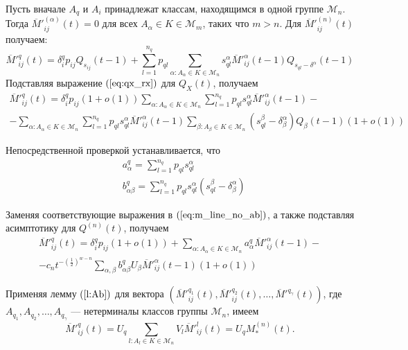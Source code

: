 \documentclass[12pt]{article}
\begin{document}
Пусть вначале $A_q$ и $A_i$ принадлежат классам, находящимся в одной группе $\mathcal{M}_n$. Тогда $\overline{M}'^{(\alpha)}_{ij}(t) = 0$ для всех $A_\alpha \in K \in \mathcal{M}_m$, таких что $m > n$. Для $\overline{M}'^{(n)}_{ij}(t)$ получаем:
\begin{equation*}
	\overline{M}'^q_{ij}(t) = \delta^q_i p_{ij} Q_{s_{ij}}(t - 1) + \sum_{l = 1}^{n_q} p_{ql} \sum_{\alpha : A_\alpha \in K \in \mathcal{M}_n} s_{ql}^\alpha \overline{M}'^\alpha_{ij}(t - 1) Q_{s_{ql} - \delta^\alpha}(t-1)
\end{equation*}
Подставляя выражение $(\ref{eq:qx_rx})$ для $Q_X(t)$, получаем
\begin{multline}
\label{eq:m_line_no_ab}
	\overline{M}'^q_{ij}(t) = \delta^q_i p_{ij} (1 + o(1)) \sum_{\alpha : A_\alpha \in K \in \mathcal{M}_n} \sum_{l = 1}^{n_q} p_{ql} s_{ql}^\alpha \overline{M}'^\alpha_{ij}(t-1) - \\
	- \sum_{\alpha : A_{\alpha} \in K \in \mathcal{M}_n} \sum_{l = 1}^{n_q} p_{ql} s_{ql}^\alpha \overline{M}'^\alpha_{ij}(t-1) \sum_{\beta : A_\beta \in K \in \mathcal{M}_n} (s_{ql}^\beta - \delta^\alpha_\beta) Q_\beta(t-1) (1 + o(1))
\end{multline}

Непосредственной проверкой устанавливается, что
\begin{equation}
\label{eq:ab}
	\begin{split}
		&a^q_\alpha = \sum_{l = 1}^{n_q} p_{ql} s_{ql}^\alpha \\
		&b^q_{\alpha \beta} = \sum_{l = 1}^{n_q} p_{ql} s_{ql}^\alpha (s_{ql}^\beta - \delta^\alpha_\beta)
	\end{split}
\end{equation}

Заменяя соответствующие выражения в $(\ref{eq:m_line_no_ab})$, а также подставляя асимптотику для $Q^{(n)}(t)$, получаем
\begin{multline}
\label{eq:m_line_ab}
	\overline{M}'^q_{ij}(t) = \delta^q_i p_{ij} (1 + o(1)) + \sum_{\alpha : A_\alpha \in K \in \mathcal{M}_n} a^q_\alpha \overline{M}'^\alpha_{ij}(t-1) - \\
	- c_n t^{-\left(\frac{1}{2}\right)^{w-n}} \sum_{\alpha,\beta} b^q_{\alpha \beta} U_\beta \overline{M}'^\alpha_{ij}(t-1) (1 + o(1))
\end{multline}

Применяя лемму $(\ref{l:Ab})$ для вектора $(\overline{M}'^{q_1}_{ij}(t), \overline{M}'^{q_2}_{ij}(t), \ldots, \overline{M}'^{q_\gamma}(t))$, где $A_{q_1}, A_{q_2}, \ldots, A_{q_\gamma}$ --- нетерминалы классов группы $\mathcal{M}_n$, имеем
\begin{equation*}
\label{eq:muv}
	\overline{M}'^q_{ij}(t) = U_q \sum_{l : A_l \in K \in \mathcal{M}_n} V_l \overline{M}'^l_{ij}(t) = U_q M^{(n)}_*(t).
\end{equation*}
\end{document}
